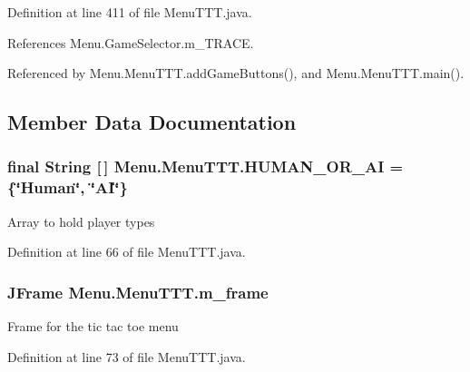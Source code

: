 Definition at line 411 of file Menu\+T\+T\+T.\+java.



References Menu.\+Game\+Selector.\+m\+\_\+\+T\+R\+A\+C\+E.



Referenced by Menu.\+Menu\+T\+T\+T.\+add\+Game\+Buttons(), and Menu.\+Menu\+T\+T\+T.\+main().



\subsection{Member Data Documentation}
\hypertarget{class_menu_1_1_menu_t_t_t_ae21a60dde8c0681fe99ca3a163713775}{}
\subsubsection[{H\+U\+M\+A\+N\+\_\+\+O\+R\+\_\+\+A\+I}]{\setlength{\rightskip}{0pt plus 5cm}final String \mbox{[}$\,$\mbox{]} Menu.\+Menu\+T\+T\+T.\+H\+U\+M\+A\+N\+\_\+\+O\+R\+\_\+\+A\+I = \{\char`\"{}Human\char`\"{}, \char`\"{}A\+I\char`\"{}\}\hspace{0.3cm}{\ttfamily [private]}}\label{class_menu_1_1_menu_t_t_t_ae21a60dde8c0681fe99ca3a163713775}
Array to hold player types 

Definition at line 66 of file Menu\+T\+T\+T.\+java.

\hypertarget{class_menu_1_1_menu_t_t_t_a22f4227f781ebf5a22bb0c68c588537d}{}
\subsubsection[{m\+\_\+frame}]{\setlength{\rightskip}{0pt plus 5cm}J\+Frame Menu.\+Menu\+T\+T\+T.\+m\+\_\+frame\hspace{0.3cm}{\ttfamily [private]}}\label{class_menu_1_1_menu_t_t_t_a22f4227f781ebf5a22bb0c68c588537d}
Frame for the tic tac toe menu 

Definition at line 73 of file Menu\+T\+T\+T.\+java.

\hypertarget{class_menu_1_1_menu_t_t_t_a59b7acc44f8e856bd54c46a8c81b1990}{}
